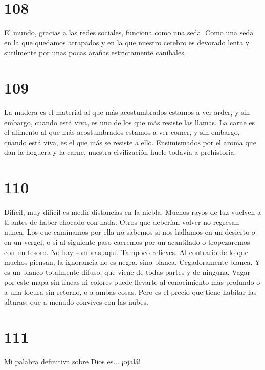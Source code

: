 \documentclass[a4paper,11pt,openright,twocolumn]{book}
\begin{document}
\section*{108}

El mundo, gracias a las redes sociales, funciona como una seda. Como una seda en la que quedamos
atrapados y en la que nuestro cerebro es devorado lenta y sutilmente por unas pocas arañas estrictamente caníbales. 

\section*{109}

La madera es el material al que más acostumbrados estamos a ver arder, y sin embargo, cuando está viva,
 es uno de los que
más resiste las llamas. La carne es el alimento al que más acostumbrados estamos a ver comer, y sin
embargo, cuando está viva, es el que más se resiste a ello. Ensimismados por el aroma
que dan la hoguera y la carne, nuestra civilización huele todavía a prehistoria. 

\section*{110}

Difícil, muy difícil es medir distancias en la niebla. Muchos rayos de luz vuelven a ti antes de
haber chocado con nada. Otros que deberían volver no regresan nunca. Los que caminamos por ella
no sabemos si nos hallamos en un desierto o en un vergel, o si al siguiente paso caeremos por
un acantilado o tropezaremos con un tesoro. No hay sombras aquí. Tampoco relieves. Al contrario
de lo que muchos piensan, la ignorancia no es negra, sino blanca. Cegadoramente blanca. Y es un blanco
totalmente difuso, que viene de todas partes y de ninguna. Vagar por este mapa sin líneas ni colores
puede llevarte al conocimiento más profundo o a una locura sin retorno, o a ambas cosas. Pero es el
precio que tiene habitar las alturas: que a menudo convives con las nubes.

\section*{111}

Mi palabra definitiva sobre Dios es... ¡ojalá!

\end{document}
